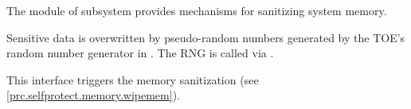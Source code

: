 



The module  of subsystem 
provides mechanisms for sanitizing system memory. 



Sensitive data is overwritten by pseudo-random numbers generated by the TOE's
random number generator in . The RNG is called
via .




This interface triggers the memory sanitization (see \autoref{prc.selfprotect.memory.wipemem}). 






